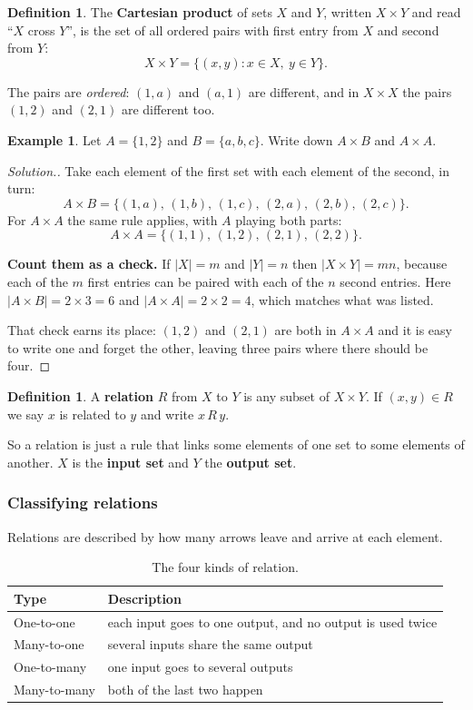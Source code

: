 \documentclass[11pt,a4paper]{article}
\theoremstyle{definition}
\newtheorem{definition}[thm]{Definition}
\newtheorem{example}[thm]{Example}
\newenvironment{solution}
  {\renewcommand{\qedsymbol}{}\begin{proof}[\textit{Solution}.]}
  {\end{proof}}
\begin{document}
\begin{definition}
The \textbf{Cartesian product} of sets $X$ and $Y$, written $X\times Y$ and read
``$X$ cross $Y$'', is the set of all ordered pairs with first entry from $X$ and
second from $Y$:
$$X\times Y=\{(x,y) : x\in X,\ y\in Y\}.$$
\end{definition}

The pairs are \emph{ordered}: $(1,a)$ and $(a,1)$ are different, and in $X\times X$ the
pairs $(1,2)$ and $(2,1)$ are different too.

\begin{example}
Let $A=\{1,2\}$ and $B=\{a,b,c\}$. Write down $A\times B$ and $A\times A$.
\end{example}

\begin{solution}
Take each element of the first set with each element of the second, in turn:
$$A\times B=\{(1,a),\,(1,b),\,(1,c),\,(2,a),\,(2,b),\,(2,c)\}.$$
For $A\times A$ the same rule applies, with $A$ playing both parts:
$$A\times A=\{(1,1),\,(1,2),\,(2,1),\,(2,2)\}.$$

\textbf{Count them as a check.} If $|X|=m$ and $|Y|=n$ then $|X\times Y|=mn$, because
each of the $m$ first entries can be paired with each of the $n$ second entries. Here
$|A\times B|=2\times 3=6$ and $|A\times A|=2\times 2=4$, which matches what was
listed.

That check earns its place: $(1,2)$ and $(2,1)$ are both in $A\times A$ and it is easy
to write one and forget the other, leaving three pairs where there should be four.
\end{solution}

\begin{definition}
A \textbf{relation} $R$ from $X$ to $Y$ is any subset of $X\times Y$. If
$(x,y)\in R$ we say $x$ is related to $y$ and write $x\,R\,y$.
\end{definition}

So a relation is just a rule that links some elements of one set to some elements of
another. $X$ is the \textbf{input set} and $Y$ the \textbf{output set}.

\subsubsection{Classifying relations}

Relations are described by how many arrows leave and arrive at each element.

\begin{table}[H]
\centering
\begin{tabular}{|l|l|}
\hline
Type & Description\\
\hline
One-to-one & each input goes to one output, and no output is used twice\\
Many-to-one & several inputs share the same output\\
One-to-many & one input goes to several outputs\\
Many-to-many & both of the last two happen\\
\hline
\end{tabular}
\caption{The four kinds of relation.}
\end{table}
\end{document}

